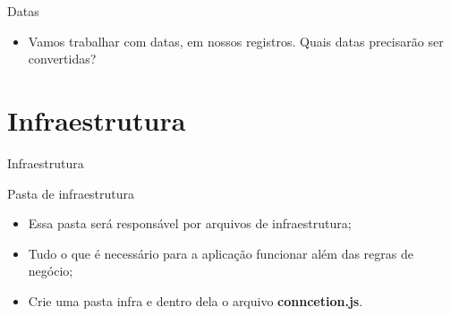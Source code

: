 \documentclass{beamer}
\begin{document}
    \begin{frame}[label=lists]{Datas}
          \begin{itemize}
            \item Vamos trabalhar com datas, em nossos registros.
            \ietm Quais datas precisarão ser convertidas?
          \end{itemize}
           
    \end{frame}

\section{Infraestrutura}
    \begin{frame}[label=lists]{Infraestrutura}
    \begin{exampleblock}{Pasta de infraestrutura}
        	\begin{itemize}
	\item Essa pasta será responsável por arquivos de infraestrutura;
	\item Tudo o que é necessário para a aplicação funcionar além das regras de negócio;
	\item Crie uma pasta \alert{infra} e dentro dela o arquivo \textbf{conncetion.js}.
        	\end{itemize}
        	\tiny{\cite{nodejs2022api, moziladev2022js}}
      \end{exampleblock}
    \end{frame}
\end{document}
